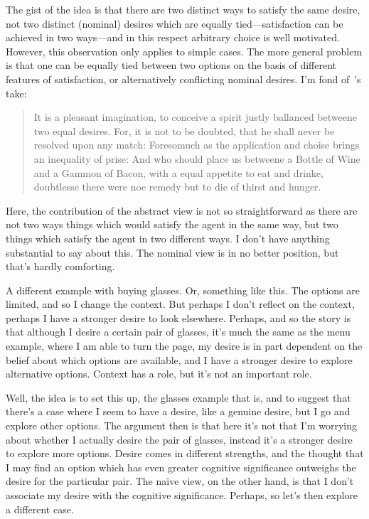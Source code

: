 \documentclass[10pt]{article}
\begin{document}
The gist of the idea is that there are two distinct ways to satisfy the same desire, not two distinct (nominal) desires which are equally tied---satisfaction can be achieved in two ways---and in this respect arbitrary choice is well motivated.
However, this observation only applies to simple cases.
The more general problem is that one can be equally tied between two options on the basis of different features of satisfaction, or alternatively conflicting nominal desires.
I'm fond of~\citeauthor{Montaigne:1965aa}'s take:

\begin{quote}
  It is a pleasant imagination, to conceive a spirit justly ballanced betweene two equal desires.
  For, it is not to be doubted, that he shall never be resolved upon any match:
  Foresomuch as the application and choise brings an inequality of prise:
  And who should place us betweene a Bottle of Wine and a Gammon of Bacon, with a equal appetite to eat and drinke, doubtlesse there were noe remedy but to die of thirst and hunger.
\end{quote}

Here, the contribution of the abstract view is not so straightforward as there are not two ways things which would satisfy the agent in the same way, but two things which satisfy the agent in two different ways.
I don't have anything substantial to say about this.
The nominal view is in no better position, but that's hardly comforting.








\newpage




A different example with buying glasses.
Or, something like this.
The options are limited, and so I change the context.
But perhaps I don't reflect on the context, perhaps I have a stronger desire to look elsewhere.
Perhaps, and so the story is that although I desire a certain pair of glasses, it's much the same as the menu example, where I am able to turn the page, my desire is in part dependent on the belief about which options are available, and I have a stronger desire to explore alternative options.
Context has a role, but it's not an important role.

Well, the idea is to set this up, the glasses example that is, and to suggest that there's a case where I seem to have a desire, like a genuine desire, but I go and explore other options.
The argument then is that here it's not that I'm worrying about whether I actually desire the pair of glasses, instead it's a stronger desire to explore more options.
Desire comes in different strengths, and the thought that I may find an option which has even greater cognitive significance outweighs the desire for the particular pair.
The na\"{i}ve view, on the other hand, is that I don't associate my desire with the cognitive significance.
Perhaps, so let's then explore a different case.
\end{document}
